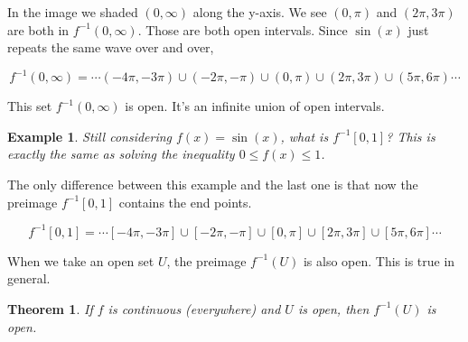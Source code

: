 \documentclass[11pt]{book}
\newtheorem{theorem}{Theorem}
\newtheorem{example}{Example}
\numberwithin{example}{chapter}
\begin{document}
\begin{center}
\end{center}






In the image we shaded $(0,\infty)$ along the y-axis.  We see $(0,\pi)$ and $(2\pi,3\pi)$ are both in $f^{-1}(0,\infty)$.  Those are both open intervals.  Since $\sin(x)$ just repeats the same wave over and over, 

$$f^{-1}(0,\infty) = \cdots (-4\pi,-3\pi)\cup (-2\pi,-\pi) \cup  (0,\pi) \cup  (2\pi,3\pi) \cup  (5\pi,6\pi) \cdots $$

This set $f^{-1}(0,\infty)$ is open.  It's an infinite union of open intervals.  


\begin{example}
Still considering $f(x)=\sin(x)$, what is $f^{-1}[0,1]$?  This is exactly the same as solving the inequality $0\leq f(x) \leq 1$.  
\end{example}

The only difference between this example and the last one is that now the preimage $f^{-1}[0,1]$ contains the end points.  

$$f^{-1}[0,1] = \cdots [-4\pi,-3\pi]\cup [-2\pi,-\pi] \cup  [0,\pi] \cup  [2\pi,3\pi] \cup  [5\pi,6\pi] \cdots $$

When we take an open set $U$, the preimage $f^{-1}(U)$ is also open.  This is true in general.

\begin{theorem}
If $f$ is continuous (everywhere) and $U$ is open, then $f^{-1}(U)$ is open.
\end{theorem}
\end{document}
